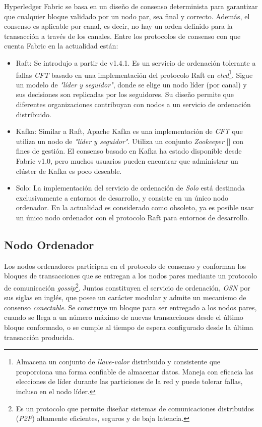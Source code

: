 Hyperledger Fabric se basa en un dise\~no de consenso determinista para garantizar que cualquier bloque validado por un nodo par, sea final y correcto.  Adem\'as, el consenso es aplicable por canal, es decir, no hay un orden definido para la transacci\'on a trav\'es de los canales.
Entre los protocolos de consenso con que cuenta Fabric en la actualidad est\'an:
\begin{itemize}
\item Raft: Se introdujo a partir de v1.4.1. Es un servicio de ordenaci\'on tolerante a fallas \emph{CFT} basado en una implementaci\'on del protocolo Raft en \emph{etcd}\footnote{Almacena un conjunto de \emph{llave-valor} distribuido y consistente que proporciona una forma confiable de almacenar datos. Maneja con eficacia las elecciones de l\'ider durante las particiones de la red y puede tolerar fallas, incluso en el nodo l\'ider.}. Sigue un modelo de \emph{"l\'ider y seguidor"}, donde se elige un nodo l\'ider (por canal) y sus decisiones son replicadas por los seguidores. Su dise\~no permite que diferentes organizaciones contribuyan con nodos a un servicio de ordenaci\'on distribuido.

\item Kafka: Similar a Raft, Apache Kafka es una implementaci\'on de \emph{CFT} que utiliza un nodo de \emph{"l\'ider y seguidor"}. Utiliza un conjunto \emph{Zookeeper} [\cite{junqueira2013zookeeper}] con fines de gesti\'on. El consenso basado en Kafka ha estado disponible desde Fabric v1.0, pero muchos usuarios pueden encontrar que administrar un cl\'uster de Kafka es poco deseable.

\item Solo: La implementaci\'on del servicio de ordenaci\'on de \emph{Solo} est\'a destinada exclusivamente a entornos de desarrollo, y consiste en un \'unico nodo ordenador. En la actualidad es considerado como obsoleto, ya es posible usar un \'unico nodo ordenador con el protocolo Raft para entornos de desarrollo. 
\end{itemize}

\subsection{Nodo Ordenador}
Los nodos ordenadores participan en el protocolo de consenso y conforman los bloques de transacciones que se entregan a los nodos pares mediante un protocolo de comunicaci\'on \emph{gossip}\footnote{Es un protocolo que permite dise\~nar sistemas de comunicaciones distribuidos (\emph{P2P}) altamente eficientes, seguros y de baja latencia.}. Juntos constituyen el servicio de ordenaci\'on, \emph{OSN} por sus siglas en ingl\'es, que posee un car\'acter modular y admite un mecanismo de consenso \emph{conectable}. Se construye un bloque para ser entregado a los nodos pares, cuando se llega a un n\'umero m\'aximo de nuevas transacciones desde el \'ultimo bloque conformado, o se cumple al tiempo de espera configurado desde la \'ultima transacci\'on producida.

